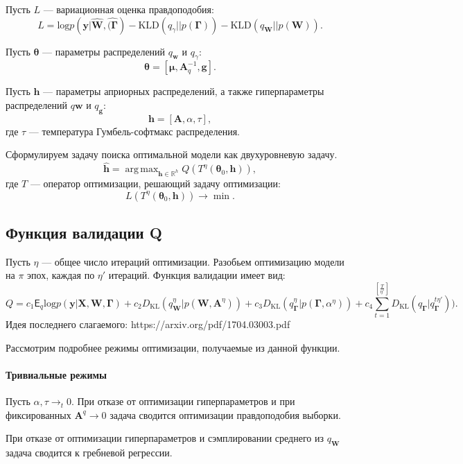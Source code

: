 \documentclass[12pt]{article}
\DeclareMathOperator*{\argmax}{arg\,max}
\begin{document}
Пусть $L$ --- вариационная оценка правдоподобия:
\[
    L = \text{log} p(\mathbf{y}|\hat{\mathbf{W}}, \hat{(\boldsymbol{\Gamma}}) - \text{KLD}(q_\gamma||p(\boldsymbol{\Gamma})) - \text{KLD}(q_\mathbf{W}||p(\mathbf{W})).
\]


Пусть $\boldsymbol{\theta}$ --- параметры распределений $q_\mathbf{w}$ и $q_\gamma$:
\[
    \boldsymbol{\theta} = [\boldsymbol{\mu}, \mathbf{A}_q^{-1}, \mathbf{g}].
\] 

Пусть $\mathbf{h}$ --- параметры априорных распределений, а также гиперпараметры распределений  $q\mathbf{w}$ и $q_\mathbf{g}$:
\[
    \mathbf{h} = [\mathbf{A}, \alpha, \tau],
\]
где $\tau$ --- температура Гумбель-софтмакс распределения.



Сформулируем задачу поиска оптимальной модели как двухуровневую задачу.
\begin{equation}
\label{eq:optim}
	\hat{\mathbf{h}} = \argmax_{\mathbf{h} \in \mathbb{R}^h} Q( T^\eta(\boldsymbol{\theta}_0, \mathbf{h})),
\end{equation}
где $T$ --- оператор оптимизации, решающий задачу оптимизации:
\[
    L(T^\eta(\boldsymbol{\theta}_0, \mathbf{h})) \to \min.
\]

\subsection{Функция валидации Q}
Пусть $\eta$ --- общее число итераций оптимизации. Разобьем оптимизацию модели на $\pi$ эпох, каждая по $\eta'$ итераций.
Функция валидации имеет вид:
\[
Q = c_1 \mathsf{E}_q \text{log}p(\mathbf{y}|\mathbf{X}, \mathbf{W}, \boldsymbol{\Gamma}) + c_2 D_\text{KL}(q_\mathbf{W}^\eta|p(\mathbf{W}, \mathbf{A}^\eta)) + c_3 D_\text{KL}(q_{\boldsymbol{\Gamma}}^\eta|p(\boldsymbol{\Gamma}, \alpha^\eta)) + c_4 \sum_{t = 1}^{[\frac{T}{\eta'}]} D_\text{KL}(q_{\boldsymbol{\Gamma}}|q^{t\eta'}_{\boldsymbol{\Gamma}})).
\] 
Идея последнего слагаемого: https://arxiv.org/pdf/1704.03003.pdf

Рассмотрим подробнее режимы оптимизации, получаемые из данной функции.
\paragraph{Тривиальные режимы}
Пусть $\alpha, \tau \to_t 0.$
При отказе от оптимизации гиперпараметров и при фиксированных $\mathbf{A}^q \to 0$ задача сводится оптимизации правдоподобия выборки. 

При отказе от оптимизации гиперпараметров и сэмплировании среднего из $q_\mathbf{W}$ задача сводится к гребневой регрессии.
\end{document}
